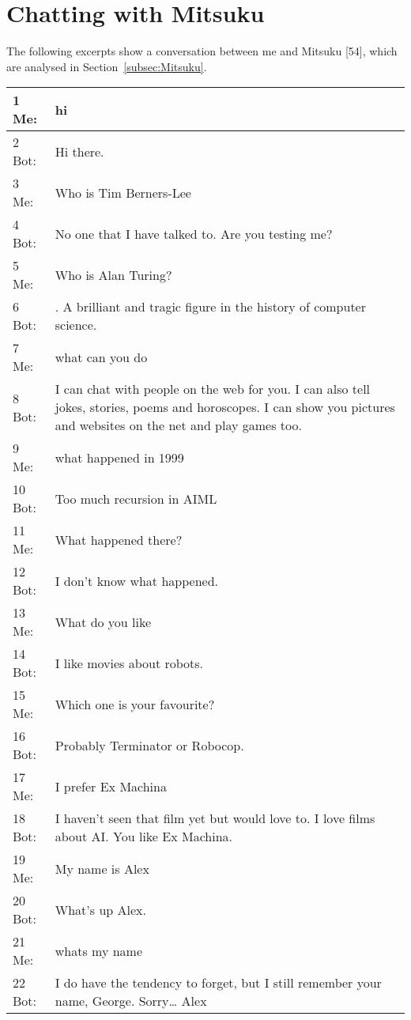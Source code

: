 \chapter{Chatting with Mitsuku}
The following excerpts show a conversation between me and Mitsuku [54], which are analysed in Section~\ref{subsec:Mitsuku}.
\renewcommand*{\arraystretch}{1.1}
\begin{longtable}{| p{} | p{} |}
	\hline
	
	1 Me: & hi \\ \hline
	2 Bot: & Hi there. \\ \hline
	3 Me: & Who is Tim Berners-Lee \\ \hline
	4 Bot: & No one that I have talked to. Are you testing me? \\ \hline
	5 Me: & Who is Alan Turing? \\ \hline
	6 Bot: & . A brilliant and tragic figure in the history of computer science. \\ \hline
	7 Me: & what can you do \\ \hline
	8 Bot: & I can chat with people on the web for you. I can also tell jokes, stories, poems and horoscopes. I can show you pictures and websites on the net and play games too. \\ \hline
	9 Me: & what happened in 1999 \\ \hline
	10 Bot: & Too much recursion in AIML \\ \hline
	11 Me: & What happened there? \\ \hline
	12 Bot: & I don't know what happened. \\ \hline
	13 Me: & What do you like \\ \hline
	14 Bot: & I like movies about robots. \\ \hline
	15 Me: & Which one is your favourite? \\ \hline
	16 Bot: & Probably Terminator or Robocop. \\ \hline
	17 Me: & I prefer Ex Machina \\ \hline
	18 Bot: & I haven't seen that film yet but would love to. I love films about AI. You like Ex Machina. \\ \hline
	19 Me: & My name is Alex \\ \hline
	20 Bot: & What's up Alex. \\ \hline
	21 Me: & whats my name \\ \hline
	22 Bot: & I do have the tendency to forget, but I still remember your name, George. Sorry… Alex \\ \hline

\end{longtable}
